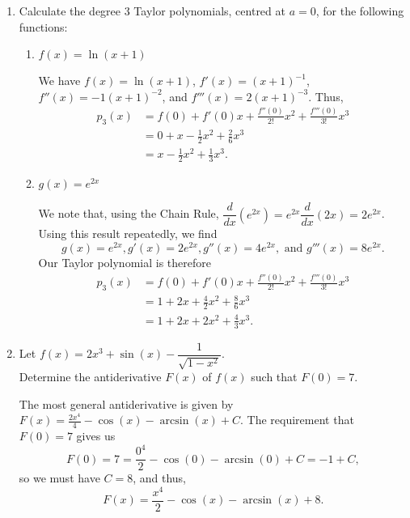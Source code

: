 \documentclass[12pt]{article}
\newcommand{\points}[1]{\marginpar{\hspace{24pt}[#1]}}
\begin{document}
\thispagestyle{fancy}

 \begin{enumerate}
 \item  Calculate the degree 3 Taylor polynomials, centred at $a=0$, for the following functions:
\begin{enumerate}
 \item $f(x) = \ln(x+1)$ \points{3}

\medskip

We have $f(x)=\ln(x+1)$, $f'(x) = (x+1)^{-1}$, $f''(x) = -1(x+1)^{-2}$, and $f'''(x)=2(x+1)^{-3}$. Thus,
\begin{align*}
 p_3(x) & = f(0)+f'(0)x+\frac{f''(0)}{2!}x^2+\frac{f'''(0)}{3!}x^3\\
        & = 0+x-\frac{1}{2}x^2+\frac{2}{6}x^3 \\& = x-\frac{1}{2}x^2+\frac{1}{3}x^3.
\end{align*}

\medskip

 \item $g(x) = e^{2x}$ \points{3}

\medskip

We note that, using the Chain Rule, $\dfrac{d}{dx}(e^{2x}) = e^{2x}\dfrac{d}{dx}(2x) = 2e^{2x}$. Using this result repeatedly, we find
\[
 g(x)=e^{2x}, g'(x)=2e^{2x}, g''(x) = 4e^{2x}, \text{ and } g'''(x) = 8e^{2x}.
\]
Our Taylor polynomial is therefore
\begin{align*}
 p_3(x)& = f(0)+f'(0)x+\frac{f''(0)}{2!}x^2+\frac{f'''(0)}{3!}x^3\\
       & = 1+2x+\frac{4}{2}x^2+\frac{8}{6}x^3\\
       & = 1+2x+2x^2+\frac{4}{3}x^3.
\end{align*}

\bigskip

\end{enumerate}

\item Let $f(x) = 2x^3+\sin(x)-\dfrac{1}{\sqrt{1-x^2}}$. \points{2}\\
Determine the antiderivative $F(x)$ of $f(x)$ such that $F(0)=7$. 

\bigskip

The most general antiderivative is given by $F(x) = \frac{2x^4}{4}-\cos(x)-\arcsin(x)+C$. The requirement that $F(0)=7$ gives us
\[
 F(0) = 7 = \frac{0^4}{2}-\cos(0)-\arcsin(0)+C = -1+C,
\]
so we must have $C=8$, and thus,
\[
 F(x) = \frac{x^4}{2}-\cos(x)-\arcsin(x)+8.
\]


\end{enumerate}
\end{document}
